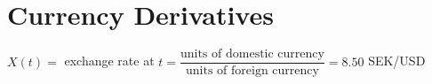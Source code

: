 \section{Currency Derivatives}
\noindent $X(t) = $ exchange rate at $t = \dfrac{\text{units of domestic currency}}{\text{units of foreign currency}} = 8.50$ SEK/USD
